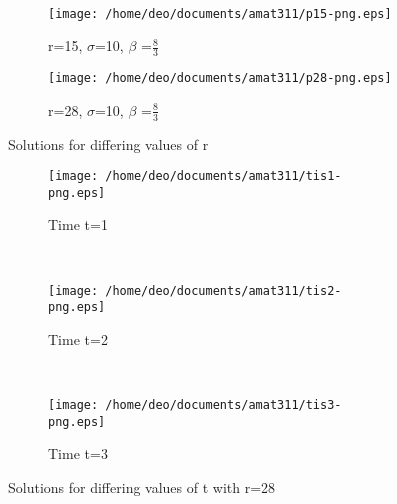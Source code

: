 \documentclass[letterpaper,titlepage,10pt]{article}
\begin{document}
{\begin{figure}
\begin{subfigure}[H]{0.3\textwidth}
        \end{subfigure}
        \qquad \qquad
        ~ %
        \begin{subfigure}[H]{0.3\textwidth}
                \texttt{[image: /home/deo/documents/amat311/p15-png.eps]}
                \caption{r=15, $\sigma$=10, $\beta$ =$\frac{8}{3}$}
                \label{fig:mouse}
        \end{subfigure}
        \quad
        \begin{subfigure}[H]{0.3\textwidth}
                \texttt{[image: /home/deo/documents/amat311/p28-png.eps]}
                \caption{r=28, $\sigma$=10, $\beta$ =$\frac{8}{3}$}
                \label{fig:mouse}
        \end{subfigure}
        \caption{Solutions for differing values of r \cite{c}}\label{fig:animals}
\end{figure}

\begin{figure}
        \centering
        \begin{subfigure}[H]{0.3\textwidth}
                \texttt{[image: /home/deo/documents/amat311/tis1-png.eps]}
                \caption{Time t=1}
                \label{fig:gull}
        \end{subfigure}%
        ~ %
        \begin{subfigure}[H]{0.3\textwidth}
                \texttt{[image: /home/deo/documents/amat311/tis2-png.eps]}
                \caption{Time t=2}
                \label{fig:tiger}
        \end{subfigure}
        ~ %
        \begin{subfigure}[H]{0.3\textwidth}
                \texttt{[image: /home/deo/documents/amat311/tis3-png.eps]}
                \caption{Time t=3}
                \label{fig:mouse}
        \end{subfigure}
        
        \caption{Solutions for differing values of t with r=28 \cite{c}}\label{fig:animals}
\end{figure}
\vfill
\clearpage
}
\end{document}
